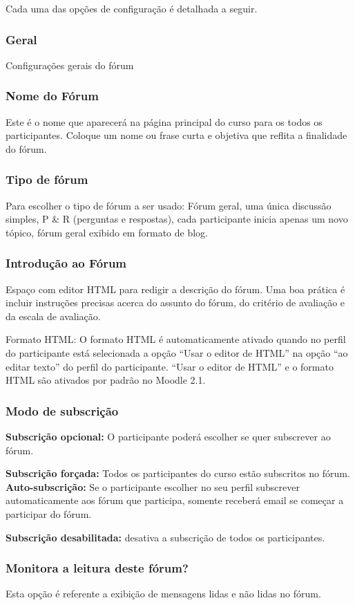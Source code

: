 Cada uma das opções de configuração é detalhada a seguir.

\subsubsection{Geral}
Configurações gerais do fórum
\subsubsection{Nome do Fórum}
Este é o nome que aparecerá na página principal do curso para os todos os participantes. Coloque um nome ou frase curta e objetiva que reflita a finalidade do fórum.
\subsubsection{Tipo de fórum}
Para escolher o tipo de fórum a ser usado: Fórum geral, uma única discussão simples, P \& R (perguntas e respostas), cada participante inicia apenas um novo tópico, fórum geral exibido em formato de blog.
\subsubsection{Introdução ao Fórum}
Espaço com editor HTML para redigir a descrição do fórum. Uma boa prática é incluir instruções precisas acerca do assunto do fórum, do critério de avaliação e da escala de avaliação.

Formato HTML: O formato HTML é automaticamente ativado quando no perfil do participante está selecionada a opção “Usar o editor de HTML” na opção “ao editar texto” do perfil do participante. “Usar o editor de HTML” e o formato HTML são ativados por padrão no Moodle 2.1.

\subsubsection{Modo de subscrição}

\textbf{Subscrição opcional:} O participante poderá escolher se quer subscrever ao fórum.

\textbf{Subscrição forçada:} Todos os participantes do curso estão subscritos no fórum.
\textbf{
Auto-subscrição:} Se o participante escolher no seu perfil subscrever automaticamente aos fórum que participa, somente receberá email se começar a participar do fórum.

\textbf{Subscrição desabilitada:} desativa a subscrição de todos os participantes.

\subsubsection{Monitora a leitura deste fórum?}
Esta opção é referente a exibição de mensagens lidas e não lidas no fórum.

